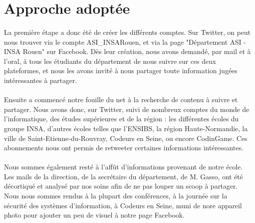 \section{Approche adoptée}

\paragraph{}
La première étape a donc été de créer les différents comptes. Sur Twitter, on peut nous trouver via le compte ASI\_INSARouen, et via la page "Département ASI - INSA Rouen" sur Facebook. Dès leur création, nous avons demandé, par mail et à l'oral, à tous les étudiants du département de nous suivre sur ces deux plateformes, et nous les avons invité à nous partager toute information jugées intéressantes à partager.

\paragraph{}
Ensuite a commencé notre fouille du net à la recherche de contenu à suivre et partager. Nous avons donc, sur Twitter, suivi de nombreux comptes du monde de l'informatique, des études supérieures et de la région : les différentes écoles du groupe INSA, d'autres écoles telles que l'ENSIBS, la région Haute-Normandie, la ville de Saint-Etienne-du-Rouvray, Codeurs en Seine, ou encore CodinGame. Ces abonnements nous ont permis de retweeter certaines informations intéressantes. 

\paragraph{}
Nous sommes également resté à l'affût d'informations provenant de notre école. Les mails de la direction, de la secrétaire du département, de M. Gasso, ont été décortiqué et analysé par nos soins afin de ne pas louper un scoop à partager. Nous nous sommes rendus à la plupart des conférences, à la journée sur la sécurité des systèmes d'information, à Codeurs en Seine, muni de nore appareil photo pour ajouter un peu de visuel à notre page Facebook.